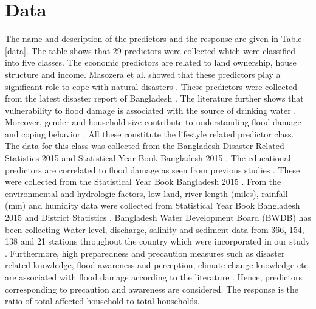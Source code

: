 \documentclass[preprint,review,12pt]{elsarticle}
\begin{document}
\section{Data}
\label{datas}
The name and description of the predictors and the response are given in Table \ref{data}. The table shows that 29 predictors were collected which were classified into five classes. The economic predictors are related to land ownership, house structure and income. Masozera et al. showed that these predictors play a significant role to cope with natural disasters \cite{masozera2007distribution}. These predictors were collected from the latest disaster report of Bangladesh \cite{disaster}. The literature further shows that vulnerability to flood damage is associated with the source of drinking water \cite{pelling1997determines}. Moreover, gender and household size contribute to understanding flood damage and coping behavior \cite{messner2006flood, poussin2014factors, masozera2007distribution}. All these constitute the lifestyle related predictor class. The data for this class was collected from the Bangladesh Disaster Related Statistics 2015 and Statistical Year Book Bangladesh 2015 \cite{disaster,disstat}. The educational predictors are correlated to flood damage as seen from previous studies \cite{thieken2005flood, merz2013multi, poussin2014factors}. These were collected from the Statistical Year Book Bangladesh 2015 \cite{disstat}. From the environmental and hydrologic factors, low land, river length (miles), rainfall (mm) and humidity data were collected from  Statistical Year Book Bangladesh 2015 and District Statistics \cite{statyear,disstat}. Bangladesh Water Development Board (BWDB) has been collecting Water level, discharge, salinity and sediment data from 366, 154, 138 and 21 stations throughout the country which were incorporated in our study \cite{hydrodata}. Furthermore, high preparedness and precaution measures such as disaster related knowledge, flood awareness and perception, climate change knowledge etc. are associated with flood damage according to the literature \cite{kreibich2011recent} \cite{bubeck2012long, thieken2005flood, merz2013multi}. Hence, predictors corresponding to precaution and awareness are considered. The response is the ratio of total affected household to total households. 
\end{document}
